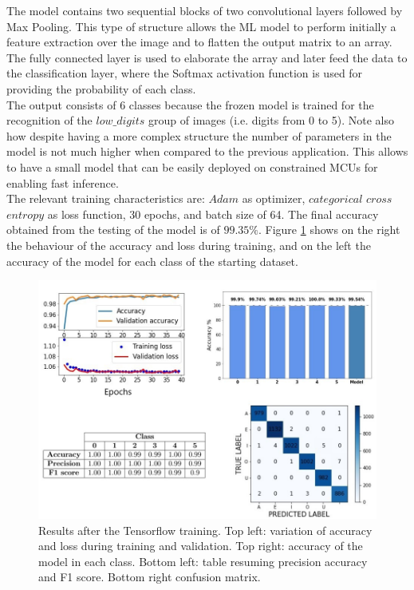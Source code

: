 \documentclass[12pt]{report}
\begin{document}
The model contains two sequential blocks of two convolutional layers followed by Max Pooling. This type of structure allows the ML model to perform initially a feature extraction over the image and to flatten the output matrix to an array. The fully connected layer is used to elaborate the array and later feed the data to the classification layer, where the Softmax activation function is used for providing the probability of each class.\\
The output consists of 6 classes because the frozen model is trained for the recognition of the $low\_ digits$ group of images (i.e. digits from 0 to 5). Note also how despite having a more complex structure the number of parameters in the model is not much higher when compared to the previous application. This allows to have a small model that can be easily deployed on constrained MCUs for enabling fast inference. \\
The relevant training characteristics are: $Adam$ as optimizer, $categorical$ $cross$ $entropy$ as loss function, 30 epochs, and batch size of 64. The final accuracy obtained from the testing of the model is of $99.35\%$. Figure \ref{fig:training_mnist} shows on the right the behaviour of the accuracy and loss during training, and on the left the accuracy of the model for each class of the starting dataset.

\begin{figure}[h!]
    \centering
    \includegraphics[width=130mm]{Figures/Chapter4/training_digits.jpg} 
    \caption{Results after the Tensorflow training. Top left: variation of accuracy and loss during training and validation. Top right: accuracy of the model in each class. Bottom left: table resuming precision accuracy and F1 score. Bottom right confusion matrix.}
    \label{fig:training_mnist}    
\end{figure}
\end{document}
